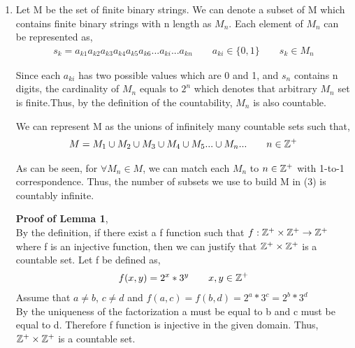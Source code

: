 \documentclass[11pt]{article}
\newcommand{\Z}{\mathbb{Z}}
\begin{document}
\renewcommand{\theenumi}{\alph{enumi}}
\begin{enumerate}
	
\item
Let M be the set of finite binary strings. We can denote a subset of M which contains finite binary strings with n length as $M_{n}$. Each element of $M_{n}$ can be represented as,
 \begin{equation*}
 \begin{split}
 s_{k} = a_{k1}a_{k2}a_{k3}a_{k4}a_{k5}a_{k6}...a_{ki}...a_{kn}
 \qquad a_{ki} \in \{0,1\} \qquad s_{k}\in M_{n}
 \end{split}
 \end{equation*}

Since each $a_{ki}$ has two possible values which are 0 and 1, and $s_{n}$ contains n digits, the cardinality of $M_{n}$ equals to $2^n$ which denotes that arbitrary $M_{n}$ set is finite.Thus, by the definition of the countability, $M_{n}$ is also countable.

We can represent M as the unions of infinitely many countable sets such that,
\begin{equation}
\begin{split}
M = M_{1}\cup M_{2}\cup M_{3}\cup M_{4}\cup M_{5}...\cup M_{n}... \qquad n \in \Z\textsuperscript{+}
\end{split}
\end{equation}

As can be seen, for $\forall M_{n} \in M$, we can match each $M_{n}$ to $n \in \Z\textsuperscript{+}$ with 1-to-1 correspondence. Thus, the number of subsets we use to build M in (3) is countably infinite.

\textbf{Proof of Lemma 1},\\
By the definition, if there exist a f function such that $f:\Z\textsuperscript{+}\times\Z\textsuperscript{+}\rightarrow \Z\textsuperscript{+}$ where f is an injective function, then we can justify that $\Z\textsuperscript{+}\times\Z\textsuperscript{+}$ is a countable set. Let f be defined as,
\begin{equation*}
\begin{split}
f(x,y) = 2^{x}*3^{y}   \qquad  x,y\in \Z\textsuperscript{+}
\end{split}
\end{equation*}
Assume that $a \neq b$, $c \neq d$ and $f(a,c) = f(b,d)=2^{a}*3^{c}=2^{b}*3^{d}$\\
By the uniqueness of the factorization a must be equal to b and c must be equal to d. Therefore f function is injective in the given domain. Thus, $\Z\textsuperscript{+}\times\Z\textsuperscript{+}$ is a countable set.


\end{enumerate}
\end{document}
